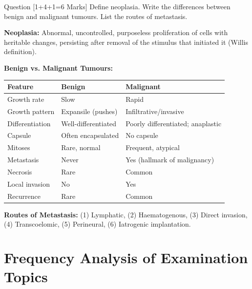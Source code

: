 \documentclass[11pt,a4paper]{article}
\begin{document}
\begin{qbox}{Question [1+4+1=6 Marks]}
Define neoplasia. Write the differences between benign and malignant tumours. List the routes of metastasis.
\end{qbox}

\begin{ansbox}
\textbf{Neoplasia:} Abnormal, uncontrolled, purposeless proliferation of cells with heritable changes, persisting after removal of the stimulus that initiated it (Willis definition).

\textbf{Benign vs. Malignant Tumours:}

\begin{center}
\begin{tabular}{p{3cm}p{5cm}p{5cm}}
\toprule
\textbf{Feature} & \textbf{Benign} & \textbf{Malignant} \\
\midrule
Growth rate & Slow & Rapid \\
Growth pattern & Expansile (pushes) & Infiltrative/invasive \\
Differentiation & Well-differentiated & Poorly differentiated; anaplastic \\
Capsule & Often encapsulated & No capsule \\
Mitoses & Rare, normal & Frequent, atypical \\
Metastasis & Never & Yes (hallmark of malignancy) \\
Necrosis & Rare & Common \\
Local invasion & No & Yes \\
Recurrence & Rare & Common \\
\bottomrule
\end{tabular}
\end{center}

\textbf{Routes of Metastasis:} (1) Lymphatic, (2) Haematogenous, (3) Direct invasion, (4) Transcoelomic, (5) Perineural, (6) Iatrogenic implantation.
\end{ansbox}

\section{Frequency Analysis of Examination Topics}
\end{document}
